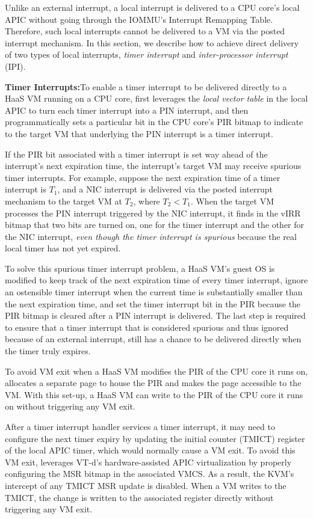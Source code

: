 Unlike an external interrupt, a local interrupt is delivered to a CPU core's local APIC without going through the IOMMU's Interrupt Remapping Table.
Therefore, such local interrupts cannot be delivered to a VM via the posted interrupt mechanism.
In this section, we describe how to achieve direct delivery of two types of local interrupts, {\em timer interrupt} and {\em inter-processor interrupt} (IPI).

{\bf Timer Interrupts:}To enable a timer interrupt to be delivered directly to a HaaS VM running on a CPU core,
\na first leverages the {\em local vector table} in the local APIC to turn each timer interrupt into a PIN interrupt, and 
then programmatically sets a particular bit in the CPU core's PIR bitmap to indicate to the target VM that underlying the PIN interrupt is a timer interrupt.

If the PIR bit associated with a timer interrupt is set way ahead of the interrupt's next expiration time, 
the interrupt's target VM may receive spurious timer interrupts. 
For example, suppose the next expiration time of a timer interrupt is $T_1$, and a NIC interrupt is delivered via the posted interrupt mechanism to the target VM at $T_2$, where ${T_2} < {T_1}$.
When the target  VM processes the PIN interrupt triggered by the NIC interrupt, it finds in the vIRR bitmap that two bits are turned on, one for the timer interrupt and the other for the NIC
interrupt, {\em even though the timer interrupt is spurious} because the real local timer has not yet expired.

To solve this spurious timer interrupt problem, a HaaS VM's guest OS is modified to keep track of the next expiration time of every timer interrupt, ignore an ostensible timer interrupt when  
the current time is substantially smaller than the next expiration time, 
and set the timer interrupt bit in the PIR because the PIR bitmap is cleared 
after a PIN interrupt is delivered.
The last step is required to ensure that a timer interrupt that is considered spurious and thus ignored because of an external interrupt,  still has a chance to be delivered directly when the timer truly expires.  

To avoid VM exit when a HaaS VM modifies the PIR of the CPU core it runs on, 
\na allocates a separate page to house the PIR and makes the page accessible to the VM.
With this set-up, a HaaS VM can write to the PIR of the CPU core it runs on without triggering any VM exit.

After a timer interrupt handler services a timer interrupt, it may need to configure the next timer expiry by updating the initial counter (TMICT) register of the local APIC timer, 
which would normally cause a VM exit. To avoid this VM exit, \na leverages VT-d's hardware-assisted APIC virtualization by properly configuring the MSR bitmap in the associated VMCS. 
As a result, the KVM's  intercept of any TMICT MSR update is disabled. When a VM writes to the TMICT, the change is written to the associated register directly without triggering any VM exit.     

